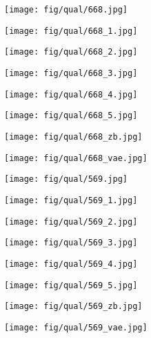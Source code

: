 \documentclass[10pt,twocolumn,letterpaper]{article}
\newcommand{\sze}{0.13}
\newcommand{\szle}{0.08}
\begin{document}
\begin{figure*}[h]
\begin{subfigure}[c]{\sze\linewidth}
\texttt{[image: fig/qual/668.jpg]}
\end{subfigure}
\begin{subfigure}[c]{\sze\linewidth}
\texttt{[image: fig/qual/668\_1.jpg]}
\end{subfigure}
\begin{subfigure}[c]{\sze\linewidth}
\texttt{[image: fig/qual/668\_2.jpg]}
\end{subfigure}
\begin{subfigure}[c]{\sze\linewidth}
\texttt{[image: fig/qual/668\_3.jpg]}
\end{subfigure}
\begin{subfigure}[c]{\sze\linewidth}
\texttt{[image: fig/qual/668\_4.jpg]}
\end{subfigure}
\hspace{3pt}
\begin{subfigure}[c]{\sze\linewidth}
\texttt{[image: fig/qual/668\_5.jpg]}
\end{subfigure}
\begin{subfigure}[c]{\szle\linewidth}
\texttt{[image: fig/qual/668\_zb.jpg]}
\end{subfigure}
\hspace{3pt}
\begin{subfigure}[c]{\szle\linewidth}
\texttt{[image: fig/qual/668\_vae.jpg]}
\end{subfigure}

\begin{subfigure}[c]{\sze\linewidth}
\texttt{[image: fig/qual/569.jpg]}
\end{subfigure}
\begin{subfigure}[c]{\sze\linewidth}
\texttt{[image: fig/qual/569\_1.jpg]}
\end{subfigure}
\begin{subfigure}[c]{\sze\linewidth}
\texttt{[image: fig/qual/569\_2.jpg]}
\end{subfigure}
\begin{subfigure}[c]{\sze\linewidth}
\texttt{[image: fig/qual/569\_3.jpg]}
\end{subfigure}
\begin{subfigure}[c]{\sze\linewidth}
\texttt{[image: fig/qual/569\_4.jpg]}
\end{subfigure}
\hspace{3pt}
\begin{subfigure}[c]{\sze\linewidth}
\texttt{[image: fig/qual/569\_5.jpg]}
\end{subfigure}
\begin{subfigure}[c]{\szle\linewidth}
\texttt{[image: fig/qual/569\_zb.jpg]}
\end{subfigure}
\hspace{3pt}
\begin{subfigure}[c]{\szle\linewidth}
\texttt{[image: fig/qual/569\_vae.jpg]}
\end{subfigure}


\end{figure*}
\end{document}
